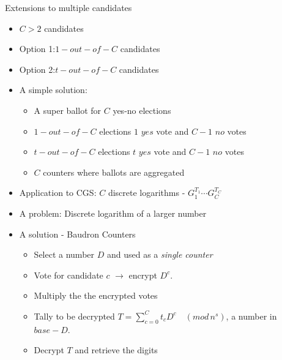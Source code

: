 \documentclass{beamer}
\newcommand{\md}[1]{\quad (mod \, {#1})}
\begin{document}
\begin{frame}[allowframebreaks]{Extensions to multiple candidates}

\begin{itemize}
\item $C>2$ candidates
\item Option 1:$1-out-of-C$ candidates 
\item Option 2:$t-out-of-C$ candidates
\item A simple solution:

\begin{itemize}
\item A super ballot for $C$ yes-no elections
\item $1-out-of-C$ elections $1$ $yes$ vote and $C-1$ $no$ votes
\item $t-out-of-C$ elections $t$ $yes$ vote and $C-1$ $no$ votes
\item $C$ counters where ballots are aggregated
\end{itemize}

\framebreak

\item Application to CGS: $C$ discrete logarithms -  $G_1^{T_1} \cdots G_C^{T_C}$
\item A problem: Discrete logarithm of a larger number
\item A solution - Baudron Counters \cite{Baudron2001}
\begin{itemize}
\item Select a number  $D$  and used as a \textit{single counter}
\item Vote for candidate $c$ $\rightarrow$ encrypt $D^c$. 
\item Multiply the the encrypted votes 
\item Tally to be decrypted $T = \sum_{c=0}^C t_c D^c \md{n^s}$, a number in $base-D$. 
\item Decrypt $T$ and retrieve the digits
\end{itemize}

\end{itemize}

\end{frame}
\end{document}
